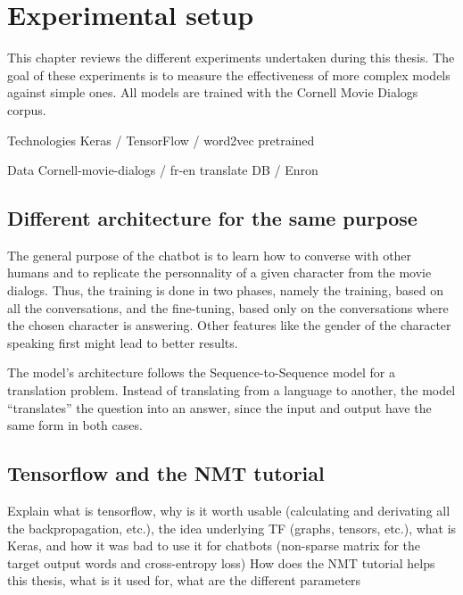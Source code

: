 
\chapter{Experimental setup} %

\label{Chapter3} %

This chapter reviews the different experiments undertaken during this thesis. The goal of these experiments is to measure the effectiveness of more complex models against simple ones. All models are trained with the Cornell Movie Dialogs corpus.

Technologies
Keras / TensorFlow / word2vec pretrained

Data
Cornell-movie-dialogs / fr-en translate DB / Enron

\section{Different architecture for the same purpose}
The general purpose of the chatbot is to learn how to converse with other humans and to replicate the personnality of a given character from the movie dialogs. Thus, the training is done in two phases, namely the training, based on all the conversations, and the fine-tuning, based only on the conversations where the chosen character is answering. Other features like the gender of the character speaking first might lead to better results.

The model's architecture follows the Sequence-to-Sequence model for a translation problem. Instead of translating from a language to another, the model ``translates'' the question into an answer, since the input and output have the same form in both cases.

\section{Tensorflow and the NMT tutorial}
Explain what is tensorflow, why is it worth usable (calculating and derivating all the backpropagation, etc.), the idea underlying TF (graphs, tensors, etc.), what is Keras, and how it was bad to use it for chatbots (non-sparse matrix for the target output words and cross-entropy loss)
How does the NMT tutorial helps this thesis, what is it used for, what are the different parameters

